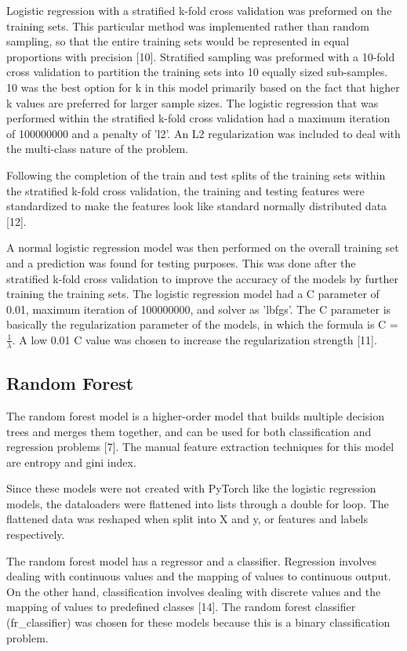 \documentclass[conference]{IEEEtran}
\begin{document}
Logistic regression with a stratified k-fold cross validation was preformed on the training sets. This particular method was implemented rather than random sampling, so that the entire training sets would be represented in equal proportions with precision [10]. Stratified sampling was preformed with a 10-fold cross validation to partition the training sets into 10 equally sized sub-samples. 10 was the best option for k in this model primarily based on the fact that higher k values are preferred for larger sample sizes. The logistic regression that was performed within the stratified k-fold cross validation had a maximum iteration of 100000000 and a penalty of 'l2'. An L2 regularization was included to deal with the multi-class nature of the problem. 

Following the completion of the train and test splits of the training sets within the stratified k-fold cross validation, the training and testing features were standardized to make the features look like standard normally distributed data [12]. 

A normal logistic regression model was then performed on the overall training set and a prediction was found for testing purposes. This was done after the stratified k-fold cross validation to improve the accuracy of the models by further training the training sets. The logistic regression model had a C parameter of 0.01, maximum iteration of 100000000, and solver as 'lbfgs'. The C parameter is basically the regularization parameter of the models, in which the formula is C = $\frac{1}{\lambda}$. A low 0.01 C value was chosen to increase the regularization strength [11]. 

\subsection{Random Forest}
The random forest model is a higher-order model that builds multiple decision trees and merges them together, and can be used for both classification and regression problems [7]. The manual feature extraction techniques for this model are entropy and gini index. 

Since these models were not created with PyTorch like the logistic regression models, the dataloaders were flattened into lists through a double for loop. The flattened data was reshaped when split into X and y, or features and labels respectively. 

The random forest model has a regressor and a classifier. Regression involves dealing with continuous values and the mapping of values to continuous output. On the other hand, classification involves dealing with discrete values and the mapping of values to predefined classes [14]. The random forest classifier (fr\_classifier) was chosen for these models because this is a binary classification problem. 
\end{document}
